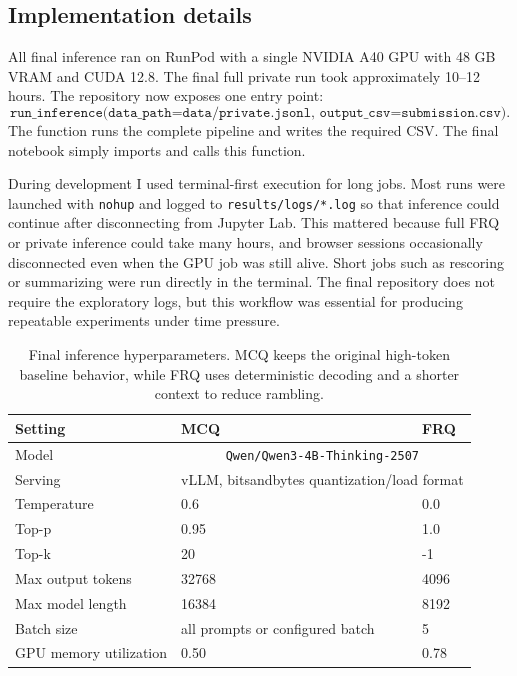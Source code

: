 \documentclass{article}
\begin{document}
\subsection{Implementation details}
\label{sec:implementation_details}

All final inference ran on RunPod with a single NVIDIA A40 GPU with 48 GB VRAM and CUDA 12.8. The final full private run took approximately 10--12 hours. The repository now exposes one entry point:
\[
\texttt{run\_inference(data\_path=\"data/private.jsonl\", output\_csv=\"submission.csv\")}.
\]
The function runs the complete pipeline and writes the required CSV. The final notebook simply imports and calls this function.

During development I used terminal-first execution for long jobs. Most runs were launched with \texttt{nohup} and logged to \texttt{results/logs/*.log} so that inference could continue after disconnecting from Jupyter Lab. This mattered because full FRQ or private inference could take many hours, and browser sessions occasionally disconnected even when the GPU job was still alive. Short jobs such as rescoring or summarizing were run directly in the terminal. The final repository does not require the exploratory logs, but this workflow was essential for producing repeatable experiments under time pressure.

\begin{table}[h]
\caption{Final inference hyperparameters. MCQ keeps the original high-token baseline behavior, while FRQ uses deterministic decoding and a shorter context to reduce rambling.}
\label{tab:hparams}
\centering
\begin{tabular}{lll}
\toprule
Setting & MCQ & FRQ \\
\midrule
Model & \multicolumn{2}{c}{\texttt{Qwen/Qwen3-4B-Thinking-2507}} \\
Serving & \multicolumn{2}{c}{vLLM, bitsandbytes quantization/load format} \\
Temperature & 0.6 & 0.0 \\
Top-p & 0.95 & 1.0 \\
Top-k & 20 & -1 \\
Max output tokens & 32768 & 4096 \\
Max model length & 16384 & 8192 \\
Batch size & all prompts or configured batch & 5 \\
GPU memory utilization & 0.50 & 0.78 \\
\bottomrule
\end{tabular}
\end{table}
\end{document}
